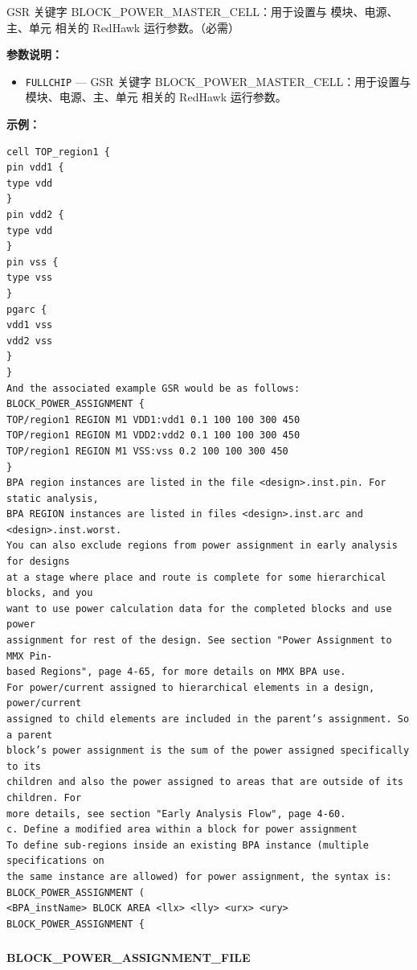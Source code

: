 GSR 关键字 BLOCK_POWER_MASTER_CELL：用于设置与 模块、电源、主、单元 相关的 RedHawk 运行参数。（必需）

\textbf{参数说明：}
\begin{itemize}
\item \texttt{FULLCHIP} — GSR 关键字 BLOCK\_POWER\_MASTER\_CELL：用于设置与 模块、电源、主、单元 相关的 RedHawk 运行参数。
\end{itemize}

\textbf{示例：}
\begin{lstlisting}
cell TOP_region1 {
pin vdd1 {
type vdd
}
pin vdd2 {
type vdd
}
pin vss {
type vss
}
pgarc {
vdd1 vss
vdd2 vss
}
}
And the associated example GSR would be as follows:
BLOCK_POWER_ASSIGNMENT {
TOP/region1 REGION M1 VDD1:vdd1 0.1 100 100 300 450
TOP/region1 REGION M1 VDD2:vdd2 0.1 100 100 300 450
TOP/region1 REGION M1 VSS:vss 0.2 100 100 300 450
}
BPA region instances are listed in the file <design>.inst.pin. For static analysis,
BPA REGION instances are listed in files <design>.inst.arc and
<design>.inst.worst.
You can also exclude regions from power assignment in early analysis for designs
at a stage where place and route is complete for some hierarchical blocks, and you
want to use power calculation data for the completed blocks and use power
assignment for rest of the design. See section "Power Assignment to MMX Pin-
based Regions", page 4-65, for more details on MMX BPA use.
For power/current assigned to hierarchical elements in a design, power/current
assigned to child elements are included in the parent‘s assignment. So a parent
block’s power assignment is the sum of the power assigned specifically to its
children and also the power assigned to areas that are outside of its children. For
more details, see section "Early Analysis Flow", page 4-60.
c. Define a modified area within a block for power assignment
To define sub-regions inside an existing BPA instance (multiple specifications on
the same instance are allowed) for power assignment, the syntax is:
BLOCK_POWER_ASSIGNMENT (
<BPA_instName> BLOCK AREA <llx> <lly> <urx> <ury>
BLOCK_POWER_ASSIGNMENT {
\end{lstlisting}

\subsubsection{}
\paragraph*{BLOCK_POWER_ASSIGNMENT_FILE}

